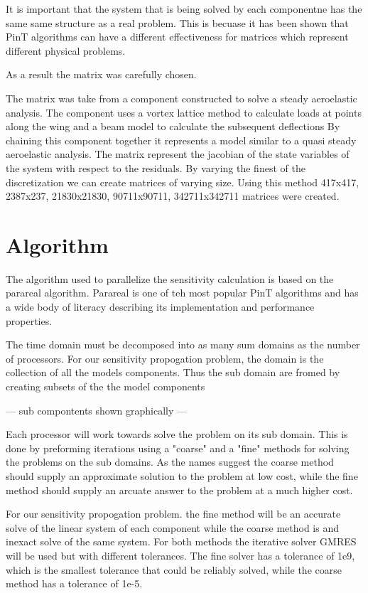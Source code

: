 \documentclass[conf]{new-aiaa}
\begin{document}
It is important that the system that is being solved by each componentne has the same same structure as a real problem.
This is becuase it has been shown that PinT algorithms can have a different effectiveness for matrices which represent different physical problems.

As a result the matrix was carefully chosen.

The matrix was take from a component constructed to solve a steady aeroelastic analysis\cite{Jasa2018a}.
The component uses a vortex lattice method to calculate loads at points along the wing and a beam model to calculate the subsequent deflections
By chaining this component together it represents a model similar to a quasi steady aeroelastic analysis.
The matrix represent the jacobian of the state variables of the system with respect to the residuals.
By varying the finest of the discretization we can create matrices of varying size.
Using this method 417x417, 2387x237, 21830x21830, 90711x90711, 342711x342711 matrices were created.




\section{Algorithm}

The algorithm used to parallelize the sensitivity calculation is based on the parareal algorithm.
Parareal is one of teh most popular PinT algorithms and has a wide body of literacy describing its implementation and performance properties.


The time domain must be decomposed into as many sum domains as the number of processors.
For our sensitivity propogation problem, the domain is the collection of all the models components.
Thus the sub domain are fromed by creating subsets of the the model components


--- sub compontents shown graphically ---


Each processor will work towards solve the problem on its sub domain.
This is done by preforming iterations using a "coarse" and a "fine" methods for solving the problems on the sub domains.
As the names suggest the coarse method should supply an approximate solution to the problem at low cost, while the fine method should supply an arcuate answer to the problem at a much higher cost.

For our sensitivity propogation problem. the fine method will be an accurate solve of the linear system of each component while the coarse method is and inexact solve of the same system.
For both methods the iterative solver GMRES will be used but with different tolerances.
The fine solver has a tolerance of 1e9, which is the smallest tolerance that could be reliably solved, while the coarse method has a tolerance of 1e-5.
\end{document}
